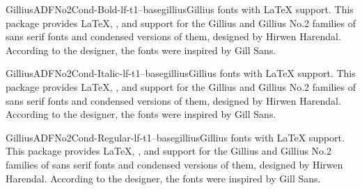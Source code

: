 \documentclass{ddltxtyp}
\begin{document}
\begin{package}{GilliusADFNo2Cond-Bold-lf-t1--base}{gillius}{Gillius fonts with {\LaTeX} support.}
This package provides {\LaTeX}, {\pdfLaTeX}, {\XeLaTeX} and {\LuaLaTeX}
support for the Gillius and Gillius No.2 families of sans
serif fonts and condensed versions of them, designed by Hirwen
Harendal. According to the designer, the fonts were inspired by
Gill Sans.
\end{package}


\begin{package}{GilliusADFNo2Cond-Italic-lf-t1--base}{gillius}{Gillius fonts with {\LaTeX} support.}
This package provides {\LaTeX}, {\pdfLaTeX}, {\XeLaTeX} and {\LuaLaTeX}
support for the Gillius and Gillius No.2 families of sans
serif fonts and condensed versions of them, designed by Hirwen
Harendal. According to the designer, the fonts were inspired by
Gill Sans.
\end{package}

\begin{package}{GilliusADFNo2Cond-Regular-lf-t1--base}{gillius}{Gillius fonts with {\LaTeX} support.}
This package provides {\LaTeX}, {\pdfLaTeX}, {\XeLaTeX} and {\LuaLaTeX}
support for the Gillius and Gillius No.2 families of sans
serif fonts and condensed versions of them, designed by Hirwen
Harendal. According to the designer, the fonts were inspired by
Gill Sans.
\end{package}

\end{document}
